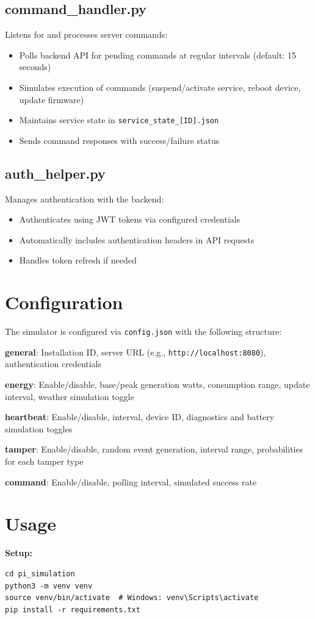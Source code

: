 \documentclass[
]{elteikthesis}[2024/04/26]
\begin{document}
\subsection{command\_handler.py}
Listens for and processes server commands:
\begin{itemize}
    \item Polls backend API for pending commands at regular intervals (default: 15 seconds)
    \item Simulates execution of commands (suspend/activate service, reboot device, update firmware)
    \item Maintains service state in \texttt{service\_state\_[ID].json}
    \item Sends command responses with success/failure status
\end{itemize}

\subsection{auth\_helper.py}
Manages authentication with the backend:
\begin{itemize}
    \item Authenticates using JWT tokens via configured credentials
    \item Automatically includes authentication headers in API requests
    \item Handles token refresh if needed
\end{itemize}

\section{Configuration}
The simulator is configured via \texttt{config.json} with the following structure:

\textbf{general}: Installation ID, server URL (e.g., \texttt{http://localhost:8080}), authentication credentials

\textbf{energy}: Enable/disable, base/peak generation watts, consumption range, update interval, weather simulation toggle

\textbf{heartbeat}: Enable/disable, interval, device ID, diagnostics and battery simulation toggles

\textbf{tamper}: Enable/disable, random event generation, interval range, probabilities for each tamper type

\textbf{command}: Enable/disable, polling interval, simulated success rate

\section{Usage}
\textbf{Setup:}
\begin{verbatim}
cd pi_simulation
python3 -m venv venv
source venv/bin/activate  # Windows: venv\Scripts\activate
pip install -r requirements.txt
\end{verbatim}
\end{document}
